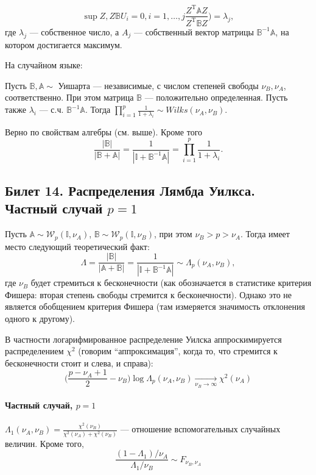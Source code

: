 %
\begin{equation*}
\sup \limits{Z, Z\mathbb{B}U_i = 0, i = 1,\dots, j}  \frac{Z^{\mathrm{T}}\mathbb{A}Z}{Z^{\mathrm{T}}\mathbb{B}Z} \Big) = \lambda_j,
\end{equation*}
%
где $\lambda_j$ --- собственное число, а $A_j$ --- собственный вектор матрицы $\mathbb{B}^{-1}\mathbb{A}$, на котором достигается максимум.

На случайном языке:
\begin{sug}
Пусть $\mathbb{B}, \mathbb{A} \sim$ Уишарта --- независимые, с числом степеней свободы $\nu_B, \nu_A$, соответственно. При этом матрица $\mathbb{B}$ --- положительно определенная. Пусть также $\lambda_i$ --- с.ч. $\mathbb{B}^{-1}\mathbb{A}$.
Тогда $\prod \limits_{i = 1}^p \frac{1}{1 + \lambda_i} \sim Wilks(\nu_A, \nu_B)$.
\end{sug}
Верно по свойствам алгебры (см. выше). Кроме того
\begin{equation*}
\frac{|\mathbb{B}|}{|\mathbb{B} + \mathbb{A}|} = \frac{1}{|\mathbb{I} + \mathbb{B}^{-1}\mathbb{A}|} = \prod \limits_{i = 1}^p \frac{1}{1 + \lambda_i}.
\end{equation*}

\subsection{Билет 14. Распределения Лямбда Уилкса. Частный случай $p=1$}
Пусть $\mathbb{A} \sim \mathcal{W}_p (\mathbb{I},\nu_A)$, $\mathbb{B} \sim \mathcal{W}_p (\mathbb{I}, \nu_B)$, при этом $\nu_B > p > \nu_A$.
Тогда имеет место следующий теоретический факт:
%
\begin{equation*}
\Lambda = \frac{|\mathbb{B}|}{|\mathbb{A} + \mathbb{B}|} =\frac{1}{|\mathbb{I} + \mathbb{B}^{-1}\mathbb{A}|} \sim \Lambda_p (\nu_A, \nu_B),
\end{equation*}
%
где $\nu_B$ будет стремиться к бесконечности (как обозначается в статистике критерия Фишера: вторая степень свободы стремится к бесконечности). Однако это не является обобщением критерия Фишера (там измеряется значимость отклонения одного к другому).

В частности логарифмированное распределение Уилска аппроскимируется распределением $\chi^2$ (говорим ``аппроксимация'', когда то, что стремится к бесконечности стоит и слева, и справа):
\begin{equation*}
\Big ( \frac{p - \nu_A + 1}{2} - \nu_B \Big )\log \Lambda_p (\nu_A, \nu_B) \underset{\nu_B \rightarrow \infty}{\longrightarrow} \chi^2(\nu_A)
\end{equation*}

\paragraph{Частный случай, $p = 1$}

$\Lambda_1 (\nu_A,\nu_B) = \frac{\chi^2(\nu_B)}{\chi^2(\nu_A)+\chi^2(\nu_B)}$ --- отношение вспомогательных случайных величин. Кроме того,
\begin{equation*}
\frac{(1 - \Lambda_1) / \nu_A}{\Lambda_1 / \nu_B} \sim F_{\nu_B,\nu_A}
\end{equation*}
